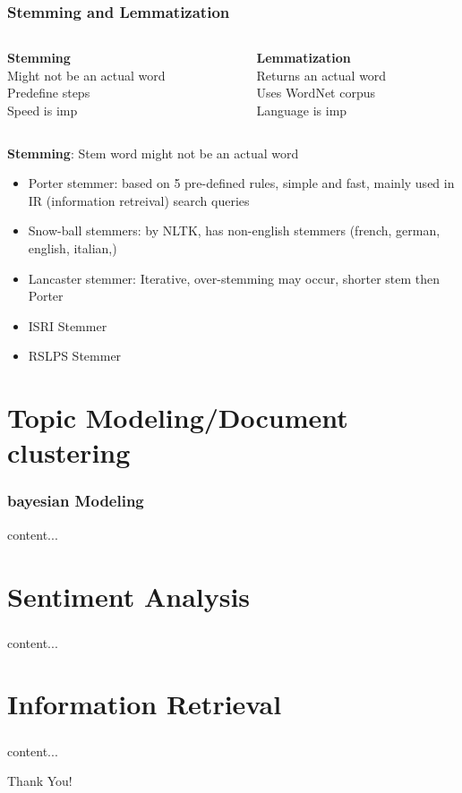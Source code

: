 \documentclass{beamer}
\begin{document}
\begin{frame}\frametitle{Stemming and Lemmatization}
	\begin{columns}
		\begin{column}{0.5\textwidth}
			\textbf{Stemming}\\
			Might not be an actual word\\
			Predefine steps\\
			Speed is imp\\
		\end{column}
		\begin{column}{0.5\textwidth}
			\textbf{Lemmatization}\\
			Returns an actual word\\
			Uses WordNet corpus\\
			Language is imp\\
		\end{column}	
	\end{columns}

	\textbf{Stemming}: Stem word might not be an actual word\\
	\begin{itemize}
		\item 	Porter stemmer: based on 5 pre-defined rules, simple and fast, mainly used in IR (information retreival) search queries
		\item Snow-ball stemmers: by NLTK, has non-english stemmers (french, german, english, italian,)
		\item 	Lancaster stemmer: Iterative, over-stemming may occur, shorter stem then Porter
		\item ISRI Stemmer
		\item RSLPS Stemmer
	\end{itemize}

\end{frame}

\section{Topic Modeling/Document clustering}
\begin{frame}\frametitle{bayesian Modeling}
	content...
\end{frame}

\section{Sentiment Analysis}
\begin{frame}\frametitle{}
content...
\end{frame}

\section{Information Retrieval}
\begin{frame}\frametitle{}
content...
\end{frame}

\begin{frame}
	Thank You!
\end{frame}
\end{document}
